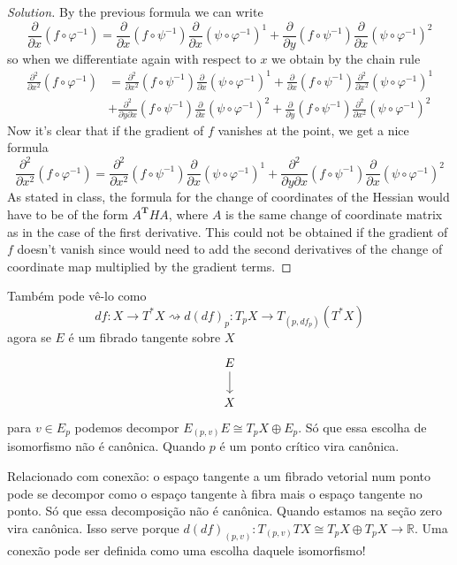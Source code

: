 \begin{exercise}
\begin{proof}[Solution]
 By the previous formula we can write
 \[\frac{\partial }{\partial x}(f \circ \varphi^{-1})=\frac{\partial }{\partial x}(f \circ \psi^{-1})\frac{\partial }{\partial x}(\psi \circ \varphi^{-1})^1 + \frac{\partial }{\partial y}(f \circ \psi^{-1})\frac{\partial }{\partial x}(\psi \circ \varphi^{-1})^2\]
 so when we differentiate again with respect to \(x\) we obtain by the chain rule
  \begin{align*}
 \frac{\partial ^2}{\partial x^2}(f\circ \varphi^{-1})&=\frac{\partial^2 }{\partial x^2}(f \circ \psi^{-1}) \frac{\partial }{\partial x}(\psi \circ \varphi^{-1})^1+\frac{\partial }{\partial x}(f \circ \psi^{-1})\frac{\partial ^2}{\partial x^2}(\psi \circ \varphi^{-1})^1\\
 &+\frac{\partial^2}{\partial y \partial x}(f \circ \psi^{-1})\frac{\partial}{\partial x}(\psi \circ \varphi^{-1})^2 + \frac{\partial }{\partial y}(f \circ \psi^{-1}) \frac{\partial^2}{\partial x^2}(\psi \circ \varphi^{-1})^2
 \end{align*}
Now it's clear that if the gradient of \(f\) vanishes at the point, we get a nice formula 
\[\frac{\partial ^2}{\partial x^2}(f\circ \varphi^{-1})=\frac{\partial^2 }{\partial x^2}(f \circ \psi^{-1}) \frac{\partial }{\partial x}(\psi \circ \varphi^{-1})^1+\frac{\partial^2}{\partial y \partial x}(f \circ \psi^{-1})\frac{\partial}{\partial x}(\psi \circ \varphi^{-1})^2\]
As stated in class, the formula for the change of coordinates of the Hessian would have to be of the form \(A^{\mathbf{T}}HA\), where \(A\) is the same change of coordinate matrix as in the case of the first derivative. This could not be obtained if the gradient of \(f\) doesn't vanish since would need to add the second derivatives of the change of coordinate map multiplied by the gradient terms.
\end{proof}

Também pode vê-lo como
\[df:X \to T^*X \rightsquigarrow d(df)_p:T_pX \to T_{(p,df_p)}(T^*X)\]
agora se \(E\) é um fibrado tangente sobre \(X\)
\[\begin{tikzcd}
E\arrow[d]\\
X
\end{tikzcd}\]
para \(v \in E_p\) podemos decompor \(E_{(p,v)}E  \cong T_pX \oplus  E_p\). Só que essa escolha de isomorfismo não é canônica. Quando \(p\) é um ponto crítico vira canônica.

Relacionado com conexão: o espaço tangente a um fibrado vetorial num ponto pode se decompor como o espaço tangente à fibra mais o espaço tangente no ponto. Só que essa decomposição não é canônica. Quando estamos na seção zero vira canônica. Isso serve porque \(d(df)_{(p,v)}:T_{(p,v)}TX \cong T_pX \oplus  T_pX\to \mathbb{R}\). Uma conexão pode ser definida como uma escolha daquele isomorfismo!


\end{exercise}
